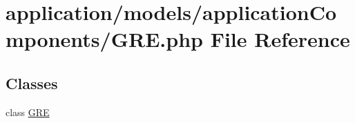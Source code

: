 \hypertarget{_g_r_e_8php}{\section{application/models/application\-Components/\-G\-R\-E.php File Reference}
\label{_g_r_e_8php}
}
\subsection*{Classes}
\begin{DoxyCompactItemize}
\item 
class \hyperlink{class_g_r_e}{G\-R\-E}
\end{DoxyCompactItemize}

